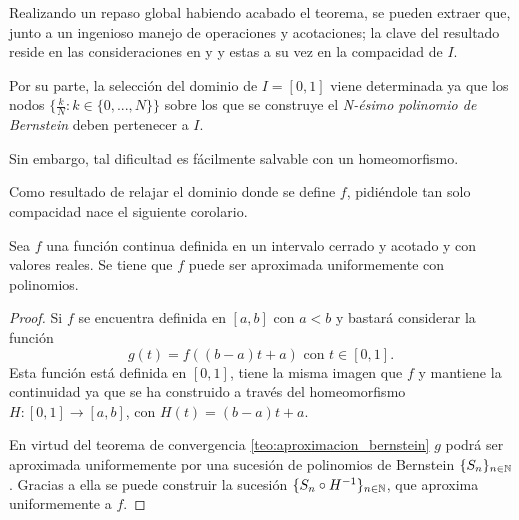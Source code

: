 %

Realizando un repaso global habiendo acabado el teorema,
 se pueden extraer que, junto a un ingenioso 
 manejo de operaciones y acotaciones; la clave del resultado reside  en las consideraciones
en  y  y estas a su vez en la 
compacidad de $I$.

Por su parte, la selección del dominio de $I = [0,1]$ viene determinada ya que 
 los nodos $\{ \frac{k}{N} \colon k\in \{0,..., N\}\}$ sobre los que se construye el \textit{N-ésimo polinomio de Bernstein}  deben pertenecer a $I$.

Sin embargo, tal dificultad es fácilmente salvable con un homeomorfismo. 



Como resultado de relajar el dominio donde se define $f$, pidiéndole tan solo
compacidad nace el siguiente corolario.  

\begin{corolario} \label{teo:Teorema-Weierstrass}
    Sea $f$ una función continua definida en un intervalo cerrado y acotado y con valores reales. Se tiene que $f$ puede ser aproximada uniformemente con polinomios. 
\end{corolario}  

\begin{proof}
    Si $f$ se encuentra definida en $[a,b]$ con $a<b$ y bastará considerar la función
    \begin{equation*}
        g(t) = f( (b-a)t + a) \text{ con } t \in [0,1].
    \end{equation*}
 Esta función está definida en $[0,1]$, tiene la misma imagen que $f$ y 
    mantiene la continuidad ya que se ha construido a través del homeomorfismo 
    $H:[0,1] \longrightarrow [a,b]$, con $H(t) = (b-a)t + a$. 

    En virtud del teorema de convergencia \ref{teo:aproximacion_bernstein}
    $g$ podrá ser aproximada uniformemente por una sucesión de polinomios de Bernstein $\{S_n\}_{n \in \mathbb{N}}$. Gracias a ella se puede
    construir la sucesión $\{S_n \circ H^{-1}\}_{n \in \mathbb{N}}$, que aproxima uniformemente a $f$. 
\end{proof}